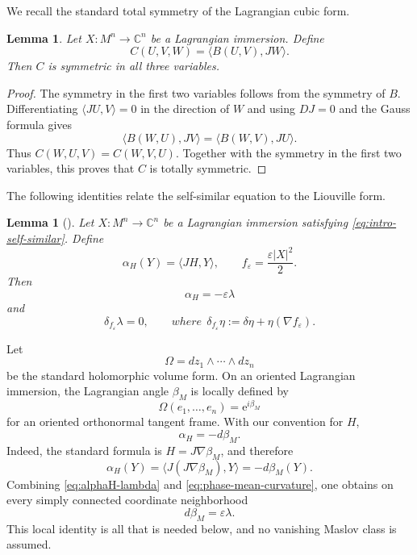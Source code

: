\documentclass[11pt,a4paper]{article}
\numberwithin{equation}{section}
\newtheorem{lemma}[theorem]{Lemma}
\newcommand{\C}{\mathbb C}
\newcommand{\ee}{\mathrm e}
\begin{document}
We recall the standard total symmetry of the Lagrangian cubic form.

\begin{lemma}
Let $X:M^n\to\C^n$ be a Lagrangian immersion.  Define
\begin{equation}
        C(U,V,W)=\langle B(U,V),JW\rangle.
\end{equation}
Then $C$ is symmetric in all three variables.
\end{lemma}

\begin{proof}
The symmetry in the first two variables follows from the symmetry of $B$.
Differentiating $\langle JU,V\rangle=0$ in the direction of $W$ and using
$DJ=0$ and the Gauss formula gives
\[
        \langle B(W,U),JV\rangle
        =
        \langle B(W,V),JU\rangle.
\]
Thus $C(W,U,V)=C(W,V,U)$.  Together with the symmetry in the first two
variables, this proves that $C$ is totally symmetric.
\end{proof}


The following identities relate the self-similar equation to the Liouville form.  

\begin{lemma}[\cite{GaoMaYao2026}]
Let $X:M^n\to\C^n$ be a Lagrangian immersion satisfying \eqref{eq:intro-self-similar}.  Define
$$
        \alpha_H(Y)=\langle JH,Y\rangle,
        \qquad
        f_\varepsilon=\frac{\varepsilon|X|^2}{2}.
$$
Then
\begin{equation}\label{eq:alphaH-lambda}
        \alpha_H=-\varepsilon\lambda
\end{equation}
and
\begin{equation}
        \delta_{f_\varepsilon}\lambda=0,
        \qquad
        where \ \ \delta_{f_\varepsilon}\eta:=\delta\eta+\eta(\nabla f_\varepsilon).
\end{equation}
\end{lemma}

Let
$$
        \Omega=dz_1\wedge\cdots\wedge dz_n
$$
be the standard holomorphic volume form.  On an oriented Lagrangian immersion, the Lagrangian angle $\beta_M$ is locally defined by
\begin{equation}
        \Omega(e_1,\ldots,e_n)=\ee^{i\beta_M}
\end{equation}
for an oriented orthonormal tangent frame. With our convention for $H$,
\begin{equation}\label{eq:phase-mean-curvature}
        \alpha_H=-d\beta_M.
\end{equation}
Indeed, the standard formula is $H=J\nabla\beta_M$, and therefore
$$
        \alpha_H(Y)
        =\langle J(J\nabla\beta_M),Y\rangle
        =-d\beta_M(Y).
$$
Combining \eqref{eq:alphaH-lambda} and \eqref{eq:phase-mean-curvature}, one obtains on every simply connected coordinate neighborhood
\begin{equation}\label{eq:d-beta-lambda}
        d\beta_M=\varepsilon\lambda.
\end{equation}
This local identity is all that is needed below, and no vanishing Maslov class is assumed.
\end{document}

